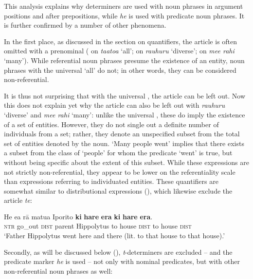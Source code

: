 This analysis explains why determiners are used with noun phrases in argument positions and after prepositions, while \textit{he} is used with predicate noun phrases. It is further confirmed by a number of other phenomena.

In the first place, as discussed in the section on quantifiers, the article is often omitted with a prenominal  ( on \textit{ta}\textit{{\ꞌ}ato{\ꞌ}a} ‘all’;  on \textit{rauhuru} ‘diverse’;  on \textit{me}\textit{{\ꞌ}e rahi} ‘many’). While referential noun phrases presume the existence of an entity, noun phrases with the universal  ‘all’ do not; in other words, they can be considered non-referential. 

It is thus not surprising that with the universal , the article can be left out. Now this does not explain yet why the article can also be left out with \textit{rauhuru} ‘diverse’ and \textit{me{\ꞌ}e rahi} ‘many’: unlike the universal , these do imply the existence of a set of entities. However, they do not single out a definite number of individuals from a set; rather, they denote an unspecified subset from the total set of entities denoted by the noun. ‘Many people went’ implies that there exists a subset from the class of ‘people’ for whom the predicate ‘went’ is true, but without being specific about the extent of this subset. While these expressions are not strictly non-referential, they appear to be lower on the referentiality scale than expressions referring to individuated entities. These quantifiers are somewhat similar to distributional expressions (), which likewise exclude the article \textit{te}:

\ea\label{ex:5.38}
\gll He e{\ꞌ}a rā matu{\ꞌ}a Iporito \textbf{ki} \textbf{hare} \textbf{era} \textbf{ki} \textbf{hare} \textbf{era}. \\
\textsc{ntr} go\_out \textsc{dist} parent Hippolytus to house \textsc{dist} to house \textsc{dist} \\

\glt 
‘Father Hippolytus went here and there (lit. to that house to that house).’ \textstyleExampleref{[R231.282]} 
\z

Secondly, as will be discussed below (), \textit{t}{}-determiners are excluded – and the predicate marker \textit{he} is used – not only with nominal predicates, but with other non-referential noun phrases as well: 

